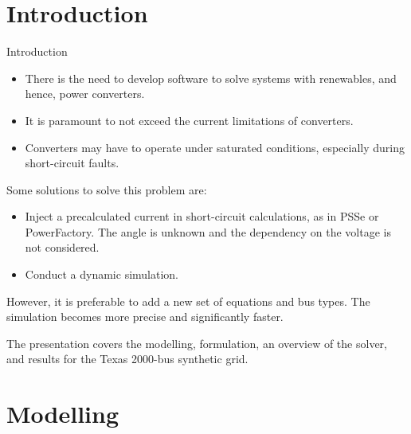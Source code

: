 \section{Introduction}
\begin{frame}{Introduction}
  \begin{itemize}
  \item There is the need to develop software to solve systems with renewables, and hence, power converters. 
  \item It is paramount to not exceed the current limitations of converters.
  \item Converters may have to operate under saturated conditions, especially during short-circuit faults.
  \end{itemize}

  Some solutions to solve this problem are:
  \begin{itemize}
    \item Inject a precalculated current in short-circuit calculations, as in PSSe or PowerFactory. The angle is unknown and the dependency on the voltage is not considered.
    \item Conduct a dynamic simulation.
  \end{itemize}
  However, it is preferable to add a new set of equations and bus types. The simulation becomes more precise and significantly faster. 

  The presentation covers the modelling, formulation, an overview of the solver, and results for the Texas 2000-bus synthetic grid.

\end{frame}


\section{Modelling}

